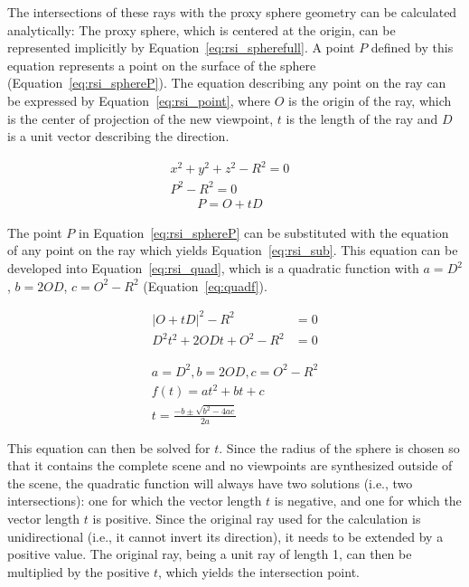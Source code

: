 The intersections of these rays with the proxy sphere geometry can be calculated analytically: The proxy sphere, which is centered at the origin, can be represented implicitly by Equation~\ref{eq:rsi_spherefull}. A point $P$ defined by this equation represents a point on the surface of the sphere (Equation~\ref{eq:rsi_sphereP}). 
The equation describing any point on the ray can be expressed by Equation~\ref{eq:rsi_point}, where $O$ is the origin of the ray, which is the center of projection of the new viewpoint, $t$ is the length of the ray and $D$ is a unit vector describing the direction. 

\begin{align}
  x^2 + y^2 + z^2 - R^2 = 0&\label{eq:rsi_spherefull}\\ 
  P^2 - R^2 = 0&\label{eq:rsi_sphereP}
\end{align} 
\begin{align}
  P = O + tD& \label{eq:rsi_point}
\end{align} 

\noindent
The point $P$ in Equation~\ref{eq:rsi_sphereP} can be substituted with the equation of any point on the ray which yields Equation~\ref{eq:rsi_sub}. This equation can be developed into Equation~\ref{eq:rsi_quad}, which is a quadratic function with $a = D^2$, $b = 2OD$, $c = O^2-R^2$ (Equation~\ref{eq:quadf}).

\begin{align}
  |O + tD|^2 - R^2 &= 0  \label{eq:rsi_sub}\\
  D^2 t^2 + 2ODt + O^2 - R^2 &= 0 \label{eq:rsi_quad}
\end{align}

\begin{align}
  a = D^2, b = 2OD, c = O^2-R^2 \nonumber \\
  f(t) = at^2 + bt + c \label{eq:quadf}\\
  t = \frac{-b \pm \sqrt{b^2 - 4ac}}{2a} \label{eq:solvequadf}
\end{align}

\noindent
This equation can then be solved for $t$. Since the radius of the sphere is chosen so that it contains the complete scene and no viewpoints are synthesized outside of the scene, the quadratic function will always have two solutions (i.e., two intersections): one for which the vector length $t$ is negative, and one for which the vector length $t$ is positive. Since the original ray used for the calculation is unidirectional (i.e., it cannot invert its direction), it needs to be extended by a positive value. The original ray, being a unit ray of length 1, can then be multiplied by the positive $t$, which yields the intersection point. 

